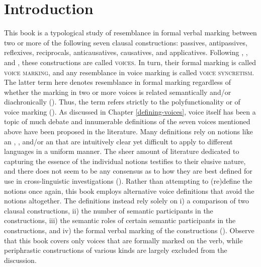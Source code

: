 \chapter{Introduction} \label{introduction}
This book is a typological study of resemblance in formal verbal marking between two or more of the following seven clausal constructions: passives, antipassives, reflexives, reciprocals, anticausatives, causatives, and applicatives. Following \citet{malchukov:2015, malchukov:2016, malchukov:2017}, \citet{creissels:2016}, and \citet{zuniga:kittila:2019}, these constructions are called \textsc{voices}. In turn, their formal marking is called \textsc{voice marking}, and any resemblance in voice marking is called \textsc{voice syncretism}. The latter term here denotes resemblance in formal marking regardless of whether the marking in two or more voices is related semantically and/or diachronically (\citealt[233f.]{zuniga:kittila:2019}). Thus, the term refers strictly to the polyfunctionality or  of voice marking (\citealt[21]{haspelmath:2019}). As discussed in Chapter \ref{defining-voices}, voice itself has been a topic of much debate and innumerable definitions of the seven voices mentioned above have been proposed in the literature. Many definitions rely on notions like an , ,  and/or an  that are intuitively clear yet difficult to apply to different languages in a uniform manner. The sheer amount of literature dedicated to capturing the essence of the individual notions testifies to their elusive nature, and there does not seem to be any consensus as to how they are best defined for use in cross-linguistic investigations (). Rather than attempting to (re)define the notions once again, this book employs alternative voice definitions that avoid the notions altogether. The definitions instead rely solely on i) a comparison of two clausal constructions, ii) the number of semantic participants in the constructions, iii) the semantic roles of certain semantic participants in the constructions, and iv) the formal verbal marking of the constructions (). Observe that this book covers only voices that are formally marked on the verb, while periphrastic constructions of various kinds are largely excluded from the discussion.

